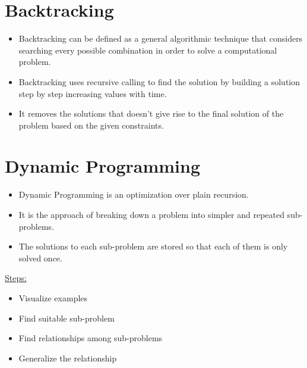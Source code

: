 \section{Backtracking}
\begin{itemize}
	\item Backtracking can be defined as a general algorithmic technique that considers searching every possible combination in order to solve a computational problem.
	\item Backtracking uses recursive calling to find the solution by building a solution step by step increasing values with time.
	\item It removes the solutions that doesn't give rise to the final solution of the problem based on the given constraints.
\end{itemize}

\section{Dynamic Programming}
\begin{itemize}
	\item Dynamic Programming is an optimization over plain recursion.
	\item It is the approach of breaking down a problem into simpler and repeated sub-problems.
	\item The solutions to each sub-problem are stored so that each of them is only solved once.
\end{itemize}

\href{https://youtu.be/aPQY__2H3tE}{Steps:}
\begin{itemize}
	\item Visualize examples
	\item Find suitable sub-problem
	\item Find relationships among sub-problems
	\item Generalize the relationship
\end{itemize}